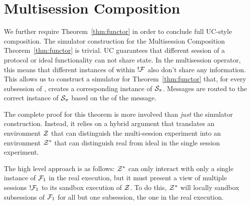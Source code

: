 \section{Multisession Composition} 
We further require Theorem~\ref{thm:functor} in order to conclude full UC-style composition.
The simulator construction for the Multisession Composition Theorem~\ref{thm:functor} is trivial.
UC guarantees that different session of a protocol or ideal functionality can not share state. 
In the multisession operator, this means that different instances of \F within $!\mathcal{F}$ also don't share any information.
This allows us to construct a simulator for Theorem~\ref{thm:functor} that, for every subsession of \F, creates a corresponding
instance of $\mathcal{S}_\pi$.
Messages are routed to the correct instance of $\mathcal{S}_\pi$ based on the  of the message. 

The complete proof for this theorem is more involved than \emph{just} the simulator construction.
Instead, it relies on a hybrid argument that translates an environment $\mathcal{Z}$ that can distinguish the multi-session experiment into an environment $\mathcal{Z}^*$ that can distinguish real from ideal in the single session experiment.

The high level approach is as follows: $\mathcal{Z}^*$ can only interact with only a single instance of $\mathcal{F}_1$ in the real execution, but it must present a view of multiple sessions $!\mathcal{F}_1$ to its sandbox execution of $\mathcal{Z}$.
To do this, $\mathcal{Z}^*$ will locally sandbox subsessions of $\mathcal{F}_1$ for all but one subsession, the one in the real execution.

